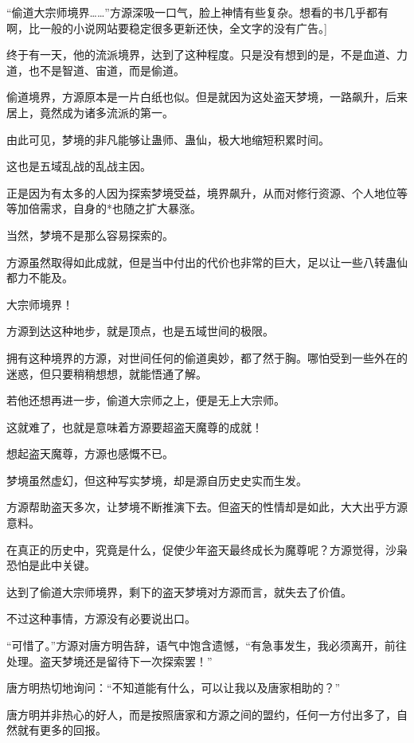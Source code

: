 
\begin{this_body}

“偷道大宗师境界……”方源深吸一口气，脸上神情有些复杂。想看的书几乎都有啊，比一般的小说网站要稳定很多更新还快，全文字的没有广告。]

终于有一天，他的流派境界，达到了这种程度。只是没有想到的是，不是血道、力道，也不是智道、宙道，而是偷道。

偷道境界，方源原本是一片白纸也似。但是就因为这处盗天梦境，一路飙升，后来居上，竟然成为诸多流派的第一。

由此可见，梦境的非凡能够让蛊师、蛊仙，极大地缩短积累时间。

这也是五域乱战的乱战主因。

正是因为有太多的人因为探索梦境受益，境界飙升，从而对修行资源、个人地位等等加倍需求，自身的*也随之扩大暴涨。

当然，梦境不是那么容易探索的。

方源虽然取得如此成就，但是当中付出的代价也非常的巨大，足以让一些八转蛊仙都力不能及。

大宗师境界！

方源到达这种地步，就是顶点，也是五域世间的极限。

拥有这种境界的方源，对世间任何的偷道奥妙，都了然于胸。哪怕受到一些外在的迷惑，但只要稍稍想想，就能悟通了解。

若他还想再进一步，偷道大宗师之上，便是无上大宗师。

这就难了，也就是意味着方源要超盗天魔尊的成就！

想起盗天魔尊，方源也感慨不已。

梦境虽然虚幻，但这种写实梦境，却是源自历史史实而生发。

方源帮助盗天多次，让梦境不断推演下去。但盗天的性情却是如此，大大出乎方源意料。

在真正的历史中，究竟是什么，促使少年盗天最终成长为魔尊呢？方源觉得，沙枭恐怕是此中关键。

达到了偷道大宗师境界，剩下的盗天梦境对方源而言，就失去了价值。

不过这种事情，方源没有必要说出口。

“可惜了。”方源对唐方明告辞，语气中饱含遗憾，“有急事发生，我必须离开，前往处理。盗天梦境还是留待下一次探索罢！”

唐方明热切地询问：“不知道能有什么，可以让我以及唐家相助的？”

唐方明并非热心的好人，而是按照唐家和方源之间的盟约，任何一方付出多了，自然就有更多的回报。


\end{this_body}
